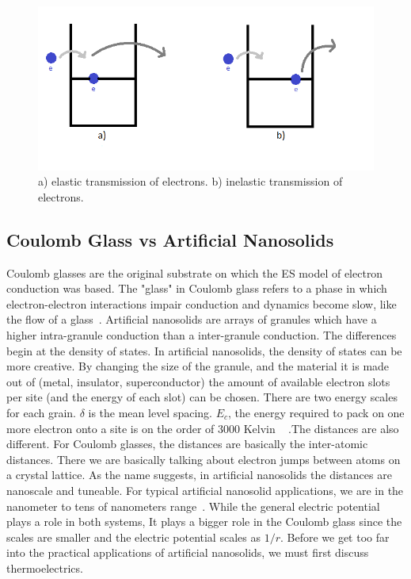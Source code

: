 \begin{figure}[htbp]
\begin{center}
\includegraphics[scale=.50]{inelasticvselastic.png}
\caption{a) elastic transmission of electrons. b) inelastic transmission of electrons.}
\label{inelasticvselastic}
\end{center}
\end{figure}


\subsection{Coulomb Glass vs Artificial Nanosolids}
Coulomb glasses are the original substrate on which the ES model of electron conduction was based. The "glass" in Coulomb glass refers to a phase in which electron-electron interactions impair conduction and dynamics become slow, like the flow of a glass~\cite{ortuno04}. Artificial nanosolids are arrays of granules which have a higher intra-granule conduction than a inter-granule conduction. The differences begin at the density of states. In artificial nanosolids, the density of states can be more creative. By changing the size of the granule, and the material it is made out of (metal, insulator, superconductor) the amount of available electron slots per site (and the energy of each slot) can be chosen. There are two energy scales for each grain. $\delta$ is the mean level spacing. $E_c$, the energy required to pack on one more electron onto a site is on the order of 3000 Kelvin ~\cite{glatz08} .The distances are also different. For Coulomb glasses, the distances are basically the inter-atomic distances. There we are basically talking about electron jumps between atoms on a crystal lattice. As the name suggests, in artificial nanosolids the distances are nanoscale and tuneable. For typical artificial nanosolid applications, we are in the nanometer to tens of nanometers range~\cite{beloborodov05}. While the general electric potential plays a role in both systems, It plays a bigger role in the Coulomb glass since the scales are smaller and the electric potential scales as $1/r$. Before we get too far into the practical applications of artificial nanosolids, we must first discuss thermoelectrics.


